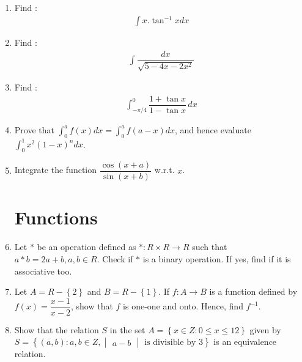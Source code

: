 \documentclass[12pt,-letter paper]{article}
\providecommand{\mydet}[1]{\ensuremath{\begin{vmatrix}#1\end{vmatrix}}}
\providecommand{\cbrak}[1]{\ensuremath{\left\{#1\right\}}}
\providecommand{\brak}[1]{\ensuremath{\left(#1\right)}}
\begin{document}
{\begin{enumerate}
\section{\centering Integration}
\item Find : \begin{align*}\int{x.\tan^{-1} {x}}{dx}\end{align*}
\item Find : \begin{align*}\int{\dfrac{dx}{\sqrt{5-4x-2x^{2}}}}\end{align*}
\item Find : \begin{align*}\int_{-\pi/4}^{0} \dfrac{1+\tan {x}}{1-\tan {x}}\,{dx}\end{align*}		
\item Prove that $\int_{0}^{a} f{\brak{x}} {dx} = \int_{0}^{a} f{\brak{a-x}} {dx}$, and hence evaluate $\int_{0}^{1} {x}^{2}{\brak{1-x}}^{n} {dx}$.
\item Integrate the function $\dfrac{\cos{\brak{x+a}}}{\sin{\brak{x+b}}}$ w.r.t. ${x}$.
\section{\centering Functions}
\item Let $*$ be an operation defined as $*:{R}\times {R} \rightarrow {R} $ such that ${a}*{b}=2{a}+{b}, {a}, {b} \in {R}$. Check if $*$ is a binary operation. If yes, find if it is associative too.
\item Let ${A}={R}-\cbrak{2}$ and ${B}={R}-\cbrak{1}$. If $f:{A} \rightarrow {B}$ is a function defined by $f({x})=\dfrac{x-1}{x-2}$, show that ${f}$ is one-one and onto. Hence, find ${f}^{-1}$.
\item Show that the relation ${S}$ in the  set  ${A}=\cbrak {{x} \in {Z} : 0 \leq {x} \leq 12}$ given by ${S}= \cbrak{\brak{a,b} :{a}, {b} \in {Z}, \mydet{a-b}\hspace {4pt} \text{is divisible by} \hspace {4pt} 3} $  is an equivalence relation.

\end{enumerate}}
\end{document}
